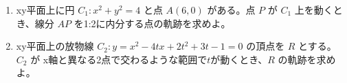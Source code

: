 \documentclass[8pt,dvipdfmx]{article}[b5paper]
\begin{document}
\begin{tcolorbox}[title=数学\textcircled{1} 5-3 ABC]
\begin{enumerate}[(1)]
\item xy平面上に円 $C_1: x^2 + y^2 = 4$ と点 $A(6, 0)$ がある。点 $P$ が $C_1$ 上を動くとき、線分 $AP$ を1:2に内分する点の軌跡を求めよ。
    \item xy平面上の放物線 $C_2: y = x^2 - 4tx + 2t^2 + 3t - 1 = 0$ の頂点を $R$ とする。$C_2$ が x軸と異なる2点で交わるような範囲で$t$が動くとき、$R$ の軌跡を求めよ。
\end{enumerate}
\end{tcolorbox}
\end{document}
